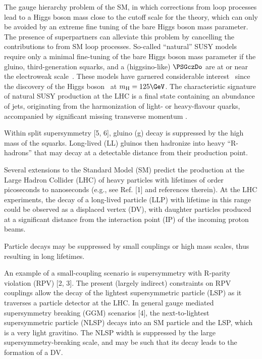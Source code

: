 The gauge hierarchy problem of the SM, in which corrections from loop
processes lead to a Higgs boson mass \higgsmass close to the cutoff
scale for the theory, which can only be avoided by an extreme fine
tuning of the bare Higgs boson mass parameter. The presence of
superpartners can alleviate this problem by cancelling the
contributions to \higgsmass from SM loop processes. So-called
``natural'' SUSY models require only a minimal fine-tuning of the bare
Higgs boson mass parameter if the gluino, third-generation squarks,
and a (higgsino-like) $\PSGczDo$ are at or near the electroweak
scale~\cite{ref:barbierinsusy}. These models have garnered
considerable interest~\cite{Delgado:2012eu, Boehm:1999tr,
  Carena:2008mj, Grober:2014aha, Grober:2015fia, Boehm:1999bj,
  Balazs:2004bu, Martin:2007gf, Martin:2007hn} since the discovery of
the Higgs boson~\cite{ref:atlashiggsdiscovery, ref:cmshiggsdiscovery,
  ref:cmshiggsdiscoverylong} at $\higgsmass = 125\GeV$. The
characteristic signature of natural SUSY production at the LHC is a
final state containing an abundance of jets, originating from the
harmonization of light- or heavy-flavour quarks, accompanied by
significant missing transverse momentum \ptvecmiss.


Within split supersymmetry [5, 6], gluino (g) decay is suppressed by
the high mass of the squarks. Long-lived (LL) gluinos then hadronize
into heavy ``R-hadrons'' that may decay at a detectable distance from
their production point.

Several extensions to the Standard Model (SM) predict the production
at the Large Hadron Collider (LHC) of heavy particles with lifetimes
of order picoseconds to nanoseconds (e.g., see Ref. [1] and references
therein). At the LHC experiments, the decay of a long-lived particle
(LLP) with lifetime in this range could be observed as a displaced
vertex (DV), with daughter particles produced at a significant
distance from the interaction point (IP) of the incoming proton
beams. 

Particle decays may be suppressed by small couplings or high mass
scales, thus resulting in long lifetimes. 

An example of a small-coupling scenario is supersymmetry with R-parity
violation (RPV) [2, 3]. The present (largely indirect) constraints on
RPV couplings allow the decay of the lightest supersymmetric particle
(LSP) as it traverses a particle detector at the LHC. In general
gauge mediated supersymmetry breaking (GGM) scenarios [4], the
next-to-lightest supersymmetric particle (NLSP) decays into an SM
particle and the LSP, which is a very light gravitino. The NLSP width
is suppressed by the large supersymmetry-breaking scale, and may be
such that its decay leads to the formation of a DV. 

